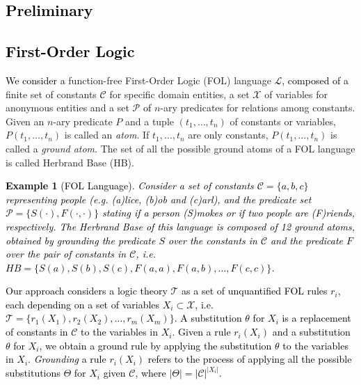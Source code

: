 \documentclass[journal]{IEEEtran}
\newtheorem{example}{Example}
\newcommand{\fg}[1]{\textcolor{blue}{#1}}
\newcommand{\ar}[1]{\textcolor{black}{#1}}
\begin{document}
\ar{\section{Preliminary}
\label{sec:preliminary}}
\ar{\subsection{First-Order Logic}
\label{sec:fol}}
\ar{We consider a} function-free First-Order Logic (FOL) language \ar{$\mathcal{L}$, composed of
a} finite set of constants \ar{$\mathcal{C}$} for specific domain entities, a set \ar{$\mathcal{X}$} of variables for anonymous entities  and a set \ar{$\mathcal{P}$ of} $n$-ary predicates for relations among constants. 
Given an $n$-ary predicate $P$ and a tuple $(t_1,\ldots,t_n)$ of constants or variables, $P(t_1,\ldots,t_n)$ is called an \emph{atom}. If $t_1,\ldots,t_n$ are only constants, $P(t_1,\ldots,t_n)$ is called a \emph{ground atom}. 
The set of all the possible ground atoms of a FOL language is called Herbrand Base (HB). 
\ar{\begin{example}[FOL Language]
\label{ex:fol}
Consider a set of constants $\mathcal{C} = \{a, b, c\}$ representing people (e.g. (a)lice, (b)ob and (c)arl), and the predicate set $\mathcal{P} = \{S(\cdot), F(\cdot,\cdot)\}$ stating if a person (S)mokes or if two people are (F)riends, respectively. The Herbrand Base of this language is composed of 12 ground atoms, obtained by grounding the predicate $S$ over the constants in $\mathcal{C}$ and the predicate $F$ over the pair of constants in $\mathcal{C}$, i.e. $HB=\{S(a),S(b),S(c),F(a,a),F(a,b),\ldots, F(c,c)\}$.
\end{example}}
\ar{Our approach considers a logic theory $\mathcal{T}$
as a set of unquantified FOL rules $r_i$, each depending on a set of variables $X_i\subset\mathcal{X}$, i.e. $\mathcal{T} =\{r_1(X_1), r_2(X_2), \ldots, r_m(X_m)\}$.} 
\ar{A substitution $\theta$ for $X_i$ is a replacement of constants in $\mathcal{C}$ to the variables in $X_i$}.
\ar{Given a rule $r_i(X_i)$ and a substitution $\theta$ for $X_i$, we obtain a ground rule %
by applying the substitution $\theta$ to the variables in $X_i$.
\textit{Grounding} a rule $r_i(X_i)$ refers to the process of applying all the possible substitutions $\Theta$ for $X_i$ given $\mathcal{C}$, where $|\Theta| =|\mathcal{C}|^{|X_i|}$.}
\end{document}
